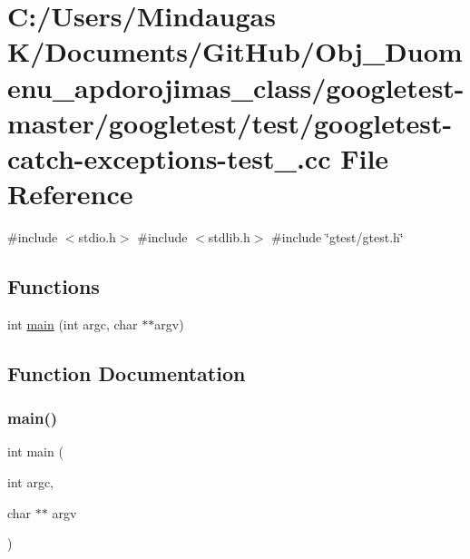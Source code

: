 \hypertarget{googletest-master_2googletest_2test_2googletest-catch-exceptions-test___8cc}{}\section{C\+:/\+Users/\+Mindaugas K/\+Documents/\+Git\+Hub/\+Obj\+\_\+\+Duomenu\+\_\+apdorojimas\+\_\+class/googletest-\/master/googletest/test/googletest-\/catch-\/exceptions-\/test\+\_\+.cc File Reference}
\label{googletest-master_2googletest_2test_2googletest-catch-exceptions-test___8cc}
{\ttfamily \#include $<$stdio.\+h$>$}\newline
{\ttfamily \#include $<$stdlib.\+h$>$}\newline
{\ttfamily \#include \char`\"{}gtest/gtest.\+h\char`\"{}}\newline
\subsection*{Functions}
\begin{DoxyCompactItemize}
\item 
int \mbox{\hyperlink{googletest-master_2googletest_2test_2googletest-catch-exceptions-test___8cc_a3c04138a5bfe5d72780bb7e82a18e627}{main}} (int argc, char $\ast$$\ast$argv)
\end{DoxyCompactItemize}


\subsection{Function Documentation}
\mbox{\label{googletest-master_2googletest_2test_2googletest-catch-exceptions-test___8cc_a3c04138a5bfe5d72780bb7e82a18e627}} 
\subsubsection{\texorpdfstring{main()}{main()}}
{\footnotesize\ttfamily int main (\begin{DoxyParamCaption}\item[{int}]{argc,  }\item[{char $\ast$$\ast$}]{argv }\end{DoxyParamCaption})}

